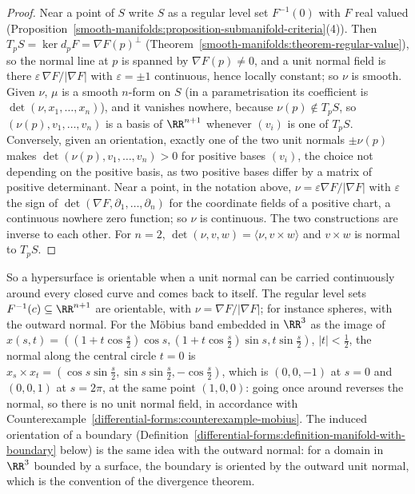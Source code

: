 \begin{proof}
Near a point of $S$ write $S$ as a regular level set $F^{-1}(0)$ with $F$ real valued (Proposition~\ref{smooth-manifolds:proposition-submanifold-criteria}(4)). Then
$T_pS = \ker d_pF = \nabla F(p)^\perp$ (Theorem~\ref{smooth-manifolds:theorem-regular-value}), so the normal line at $p$ is spanned by $\nabla F(p) \neq 0$, and a unit normal field
is there $\varepsilon\,\nabla F/|\nabla F|$ with $\varepsilon = \pm1$ continuous, hence locally constant; so $\nu$ is smooth. Given $\nu$, $\mu$ is a smooth $n$-form on $S$ (in a
parametrisation its coefficient is $\det(\nu, x_1, \ldots, x_n)$), and it vanishes nowhere, because $\nu(p) \notin T_pS$, so $(\nu(p), v_1, \ldots, v_n)$ is a basis of $\RR^{n+1}$
whenever $(v_i)$ is one of $T_pS$. Conversely, given an orientation, exactly one of the two unit normals $\pm\nu(p)$ makes $\det(\nu(p), v_1, \ldots, v_n) > 0$ for positive bases
$(v_i)$, the choice not depending on the positive basis, as two positive bases differ by a matrix of positive determinant. Near a point, in the notation above,
$\nu = \varepsilon\nabla F/|\nabla F|$ with $\varepsilon$ the sign of $\det(\nabla F, \partial_1, \ldots, \partial_n)$ for the coordinate fields of a positive chart, a continuous nowhere zero
function; so $\nu$ is continuous. The two constructions are inverse to each other. For $n = 2$, $\det(\nu, v, w) = \langle\nu, v \times w\rangle$ and $v \times w$ is normal to
$T_pS$.
\end{proof}

\begin{remark}\label{differential-forms:remark-moving-normal}
So a hypersurface is orientable when a unit normal can be carried continuously around every closed curve and comes back to itself. The regular level sets
$F^{-1}(c) \subseteq \RR^{n+1}$ are orientable, with $\nu = \nabla F/|\nabla F|$; for instance spheres, with the outward normal. For the M\"obius band embedded in
$\RR^3$ as the image of $x(s, t) = ((1 + t\cos\frac s2)\cos s, (1 + t\cos\frac s2)\sin s, t\sin\frac s2)$, $|t| < \frac12$, the normal along the central circle $t = 0$ is
$x_s \times x_t = (\cos s\sin\frac s2, \sin s\sin\frac s2, -\cos\frac s2)$, which is $(0, 0, -1)$ at $s = 0$ and $(0, 0, 1)$ at $s = 2\pi$, at the same point $(1, 0, 0)$: going once
around reverses the normal, so there is no unit normal field, in accordance with Counterexample~\ref{differential-forms:counterexample-mobius}. The induced orientation of a
boundary (Definition~\ref{differential-forms:definition-manifold-with-boundary} below) is the same idea with the outward normal: for a domain in $\RR^3$ bounded by a surface, the boundary
is oriented by the outward unit normal, which is the convention of the divergence theorem.
\end{remark}

